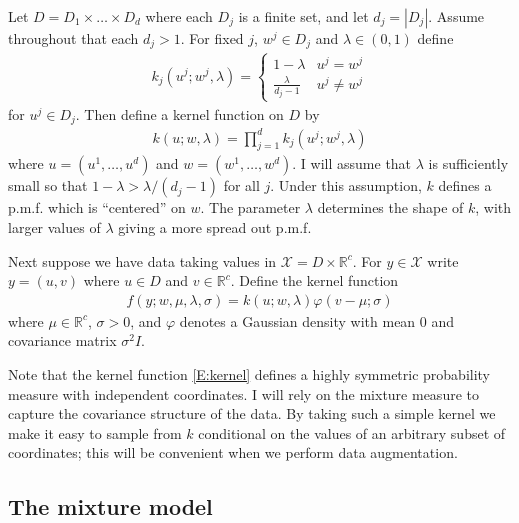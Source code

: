 \documentclass[letterpaper,11pt]{article}
\begin{document}
Let $D = D_1 \times \dots \times D_d$ where each $D_j$ is a finite set, and let $d_j = |D_j|$. Assume throughout that each $d_j > 1$. For fixed $j$, $w^j \in D_j$ and $\lambda \in (0, 1)$ define
\begin{align}\label{E:kernel-discrete-1}
    k_j(u^j; w^j, \lambda) = \begin{cases}
        1 - \lambda & u^j = w^j \\
        \frac{\lambda}{d_j - 1} & u^j \ne w^j
    \end{cases}
\end{align}
for $u^j \in D_j$. Then define a kernel function on $D$ by
\begin{align}\label{E:kernel-discrete}
    k(u; w, \lambda) = \prod_{j=1}^d k_j(u^j; w^j, \lambda)
\end{align}
where $u = (u^1, \dots, u^d)$ and $w = (w^1, \dots, w^d)$. I will assume that $\lambda$ is sufficiently small so that $1 - \lambda > \lambda/(d_j - 1)$ for all $j$. Under this assumption, $k$ defines a p.m.f. which is ``centered'' on $w$. The parameter $\lambda$ determines the shape of $k$, with larger values of $\lambda$ giving a more spread out p.m.f.

Next suppose we have data taking values in $\mathcal X = D \times \mathbb R^c$. For $y \in \mathcal X$ write $y = (u, v)$ where $u \in D$ and $v \in \mathbb R^c$. Define the kernel function
\begin{align}\label{E:kernel}
    f(y; w, \mu, \lambda, \sigma) = k(u; w, \lambda) \varphi(v - \mu; \sigma)
\end{align}
where $\mu \in \mathbb R^c$, $\sigma > 0$, and $\varphi$ denotes a Gaussian density with mean 0 and covariance matrix $\sigma^2I$.

Note that the kernel function \eqref{E:kernel} defines a highly symmetric probability measure with independent coordinates. I will rely on the mixture measure to capture the covariance structure of the data. By taking such a simple kernel we make it easy to sample from $k$ conditional on the values of an arbitrary subset of coordinates; this will be convenient when we perform data augmentation.

\subsection{The mixture model}
\end{document}
